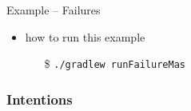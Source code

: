 \documentclass[presentation]{beamer}\mode<presentation>{\usetheme{AMSBolognaFC}}
\begin{document}
\begin{frame}[c, allowframebreaks]{Example \theJasonExample{} -- Failures}
\begin{itemize}
        \vspace{.3cm}
        
        \item how to run this example
        \begin{itemize}
            \item[\$] \texttt{./gradlew run\alert{Failure}Mas}
        \end{itemize}
        
    \end{itemize}
\end{frame}

\subsubsection{Intentions}
\end{document}
